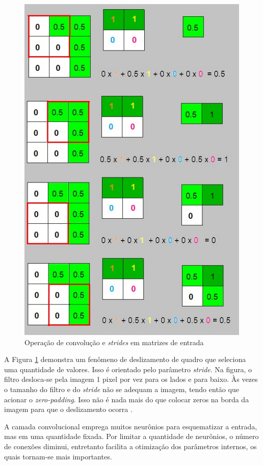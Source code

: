 \begin{figure}
    \centering
    \includegraphics[scale=0.3]{Relatorio/figuras/stride.png}
    \caption{Operação de convolução e \textit{strides} em matrizes de entrada \cite{eliveltoebermamrenatoa.krohling2018}}
    \label{fig:stride}
\end{figure}

A Figura \ref{fig:stride} demonstra um fenômeno de deslizamento de quadro que seleciona uma quantidade de valores. Isso é orientado pelo parâmetro \textit{stride}. Na figura, o filtro desloca-se pela imagem 1 pixel por vez para os lados e para baixo. Às vezes o tamanho do filtro e do \textit{stride} não se adequam a imagem, tendo então que acionar o \textit{zero-padding}. Isso não é nada mais do que colocar zeros na borda da imagem para que o deslizamento ocorra \cite{haykin2007redes}.

A camada convolucional emprega muitos neurônios para esquematizar a entrada, mas em uma quantidade fixada. Por limitar a quantidade de neurônios, o número de conexões diminui, entretanto facilita a otimização dos parâmetros internos, os quais tornam-se mais importantes.


